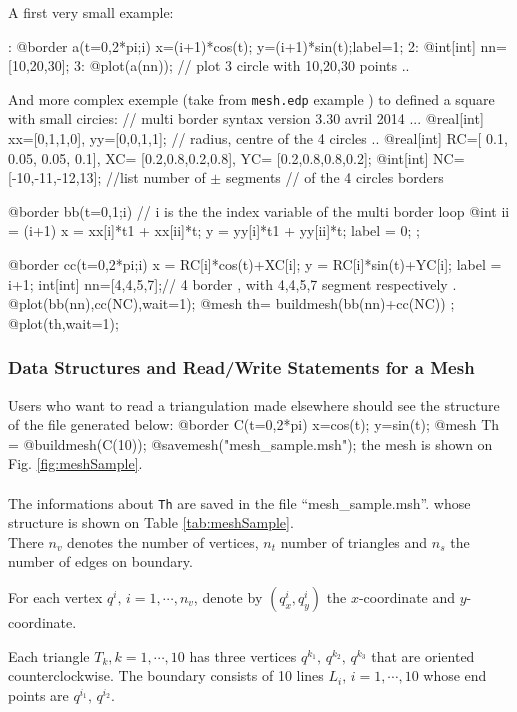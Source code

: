 \documentclass[a4paper,twoside,12pt]{book}
\begin{document}
\medskip A first very small example: 

: @border a(t=0,2*pi;i){ x=(i+1)*cos(t); y=(i+1)*sin(t);label=1;} 
2: @int[int] nn=[10,20,30]; 
3: @plot(a(nn)); //  plot 3 circle with 10,20,30 points ..
\eFF 

And  more complex exemple (take from \texttt{mesh.edp} example )  to defined a square with small circies: 
\bFF
// multi border syntax version 3.30 avril 2014 ... 
  @real[int] xx=[0,1,1,0],
            yy=[0,0,1,1];
  // radius, centre of the 4 circles .. 
  @real[int] RC=[ 0.1, 0.05, 0.05, 0.1],
            XC= [0.2,0.8,0.2,0.8],
            YC= [0.2,0.8,0.8,0.2];
  @int[int]  NC=[-10,-11,-12,13]; //list number of $\pm$ segments
  // of the 4 circles borders  

  @border bb(t=0,1;i) 
  {
  // i is the the index variable of the multi border loop 
    @int ii = (i+1)%
    x =  xx[i]*t1 + xx[ii]*t;
    y =  yy[i]*t1 + yy[ii]*t;
    label = 0; ; 
  }
  
  @border cc(t=0,2*pi;i) 
 {
    x = RC[i]*cos(t)+XC[i];
    y = RC[i]*sin(t)+YC[i];
    label = i+1; 
  }
  int[int] nn=[4,4,5,7];// 4 border , with 4,4,5,7 segment respectively . 
  @plot(bb(nn),cc(NC),wait=1);
  @mesh th= buildmesh(bb(nn)+cc(NC)) ; 
  @plot(th,wait=1); 
\eFF


\subsubsection{Data Structures and Read/Write Statements for a Mesh}

Users who want to read a triangulation made elsewhere should see the structure
of the file generated below:
\bFF
@border C(t=0,2*pi) { x=cos(t); y=sin(t); }
@mesh Th = @buildmesh(C(10));
@savemesh("mesh_sample.msh");
\eFF
the mesh is shown on Fig. \ref{fig:meshSample}.
\\\\
The informations about \texttt{Th} are saved in the file ``mesh\_sample.msh''.
whose structure is shown on Table \ref{tab:meshSample}.
\\
There $n_v$ denotes
the number of vertices, $n_t$ number of triangles
and $n_s$ the number of edges on boundary.

For each vertex $q^i,\, i=1,\cdots,n_v$, denote   by $(q^i_x,q^i_y)$
the $x$-coordinate and $y$-coordinate.

Each triangle $T_k, k=1,\cdots,10$ has three vertices $q^{k_1},\, q^{k_2},\,q^{k_3}$
that are oriented counterclockwise.
The boundary consists of 10 lines $L_i,\, i=1,\cdots,10$ whose end points are
$q^{i_1},\, q^{i_2}$.
\end{document}
